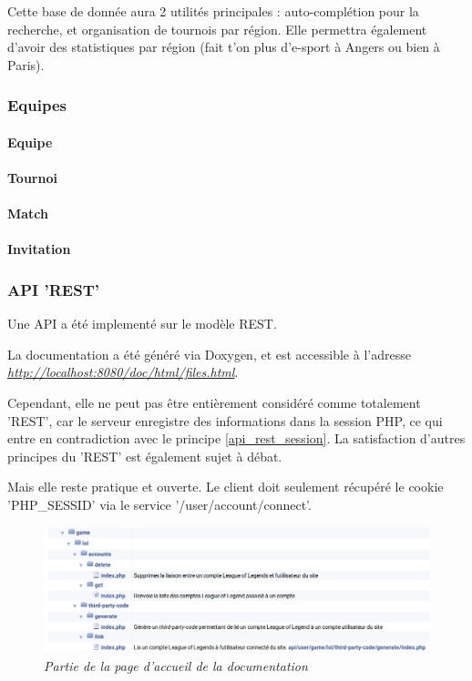 \documentclass[10pt]{article}
\begin{document}
	Cette base de donnée aura 2 utilités principales : auto-complétion pour la recherche, et organisation de tournois par région.
	Elle permettra également d'avoir des statistiques par région (fait t'on plus d'e-sport à Angers ou bien à Paris).
	
      \subsubsection{Equipes}
	\paragraph{Equipe}
	\paragraph{Tournoi}
	\paragraph{Match}
	\paragraph{Invitation}

      \subsubsection{API 'REST'}
	Une API a été implementé sur le modèle REST.
	
	La documentation a été généré via Doxygen, et est accessible à l'adresse \href{http://localhost:8080/doc/html/files.html}{\textit{http://localhost:8080/doc/html/files.html}}.
	
	Cependant, elle ne peut pas être entièrement considéré comme totalement 'REST', car le serveur enregistre des informations dans la session PHP,
	ce qui entre en contradiction avec le principe \ref{api_rest_session}. La satisfaction d'autres principes du 'REST' est également sujet à débat.
	
	Mais elle reste pratique et ouverte. Le client doit seulement récupéré le cookie 'PHP\_SESSID' via le service '/user/account/connect'.
	
      \begin{figure}[H]
	\begin{center}
	  \includegraphics[width=14cm,keepaspectratio]{./images/api.png}
	\end{center}
	\caption{\textit{Partie de la page d'accueil de la documentation}}
	\label{api}
      \end{figure}
      
\end{document}
